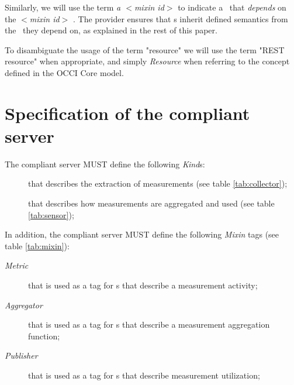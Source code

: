 \documentclass[10pt]{article}  %
\begin{document}
Similarly, we will use the term {\em a $<$mixin id$>$ \mi} to indicate a \mi\ that {\em depends} on the {\em $<$mixin id$>$} \mi. The provider ensures that \mi s inherit defined semantics from the \mi\ they depend on, as explained in the rest of this paper. 

To disambiguate the usage of the term "resource" we will use the term "REST resource" when appropriate, and simply {\em Resource} when referring to the concept defined in the OCCI Core model.

\section{Specification of the compliant server}

The compliant server MUST define the following {\em Kind}s:

\begin{description}

\item [\coll] that describes the extraction of measurements (see table \ref{tab:collector});

\item [\sens] that describes how measurements are aggregated and used (see table  \ref{tab:sensor});

\end{description}
 

In addition, the compliant server MUST define the following {\em Mixin} tags (see table \ref{tab:mixin}): 

\begin{description}

\item [{\em Metric}] that is used as a tag for \mi s that describe a measurement activity;

\item [{\em Aggregator}] that is used as a tag for \mi s that describe a measurement aggregation function;

\item [{\em Publisher}] that is used as a tag for \mi s that describe measurement utilization;

\end{description}
\end{document}
